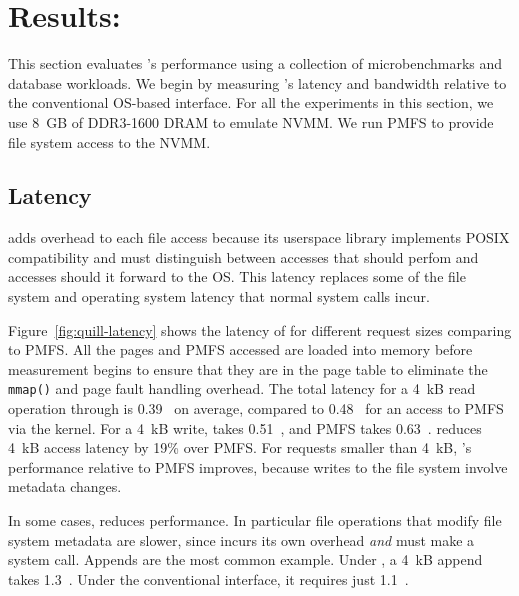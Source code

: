 
\section{Results: \DAChell{}}
\label{sec:results-quill}

This section evaluates \DAChell{}'s performance using a collection of
microbenchmarks and database workloads.  We begin by measuring \DAChell{}'s
latency and bandwidth relative to the conventional OS-based interface.  For all
the experiments in this section, we use 8~GB of DDR3-1600 DRAM to emulate 
NVMM.  We run PMFS to provide file system access to the NVMM.

\subsection{Latency}

\DAChell{} adds overhead to each file access because its userspace library
implements POSIX compatibility and must distinguish between 
accesses that \DAChell{} should perfom and accesses should it forward to the OS.
This latency replaces some of the file
system and operating system latency that normal system calls incur.

Figure~\ref{fig:quill-latency} shows the latency of \DAChell{} for different
request sizes comparing to PMFS.  All the pages \DAChell{} and PMFS accessed
are loaded into memory before measurement begins to ensure that they are in the page table to eliminate the
\texttt{mmap()} and page fault handling overhead.
The total latency for a 4~kB read operation through \DAChell{} is 0.39~\us{} on
average, compared to 0.48~\us{} for an access to PMFS via the kernel.  For a 4~kB write,
\DAChell{} takes 0.51~\us{}, and PMFS takes 0.63~\us{}. \DAChell{} reduces 4~kB
access latency by 19\% over PMFS.  For requests smaller than 4~kB,
\DAChell{}'s performance relative to PMFS improves, because writes to the file system
involve metadata changes.

In some cases, \DAChell{} reduces performance.  In particular file operations that
modify file system metadata are slower, since \DAChell{} incurs its own overhead \emph{and} must make a system call.
Appends are the most common example.
Under \DAChell{}, a 4~kB append
takes 1.3~\us{}. Under the conventional interface, it requires just
1.1~\us{}.

